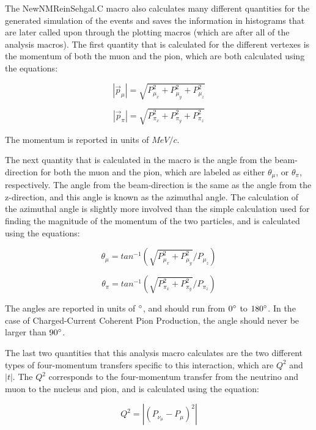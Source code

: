 \documentclass[11pt]{article}
\begin{document}
The NewNMReinSehgal.C macro also calculates many different quantities for the generated simulation of the events and saves the information in histograms that are later called upon through the plotting macros (which are after all of the analysis macros). The first quantity that is calculated for the different vertexes is the momentum of both the muon and the pion, which are both calculated using the equations:

\begin{equation}
|\vec{p}_\mu| = \sqrt{P_{\mu_x}^2 + P_{\mu_y}^2 + P_{\mu_z}^2}
\end{equation}

\begin{equation}
|\vec{p}_\pi| = \sqrt{P_{\pi_x}^2 + P_{\pi_y}^2 + P_{\pi_z}^2}
\end{equation}

\noindent
The momentum is reported in units of $MeV/c$.

The next quantity that is calculated in the macro is the angle from the beam-direction for both the muon and the pion, which are labeled as either $\theta_\mu$, or $\theta_\pi$, respectively. The angle from the beam-direction is the same as the angle from the z-direction, and this angle is known as the azimuthal angle. The calculation of the azimuthal angle is slightly more involved than the simple calculation used for finding the magnitude of the momentum of the two particles, and is calculated using the equations:

\begin{equation}
\theta_\mu = tan^{-1}(\sqrt{P_{\mu_x}^2 + P_{\mu_y}^2}/{P_{\mu_z}})
\end{equation}

\begin{equation}
\theta_\pi = tan^{-1}(\sqrt{P_{\pi_x}^2 + P_{\pi_y}^2}/{P_{\pi_z}})
\end{equation}

\noindent
The angles are reported in units of $\degree$, and should run from $0\degree$ to $180\degree$. In the case of Charged-Current Coherent Pion Production, the angle should never be larger than $90\degree$.

The last two quantities that this analysis macro calculates are the two different types of four-momentum transfers specific to this interaction, which are $Q^2$ and $|t|$. The $Q^2$ corresponds to the four-momentum transfer from the neutrino and muon to the nucleus and pion, and is calculated using the equation:

\begin{equation}
Q^2 = |(P_{\nu_\mu} - P_\mu)^2|
\end{equation}
\end{document}
